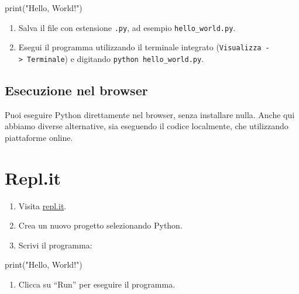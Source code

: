 \documentclass[
  letterpaper,
]{scrbook}
\newenvironment{Shaded}{\begin{snugshade}}{\end{snugshade}}
\newcommand{\BuiltInTok}[1]{\textcolor[rgb]{0.00,0.23,0.31}{#1}}
\newcommand{\NormalTok}[1]{\textcolor[rgb]{0.00,0.23,0.31}{#1}}
\newcommand{\StringTok}[1]{\textcolor[rgb]{0.13,0.47,0.30}{#1}}
\providecommand{\tightlist}{%
  \setlength{\itemsep}{0pt}\setlength{\parskip}{0pt}}\usepackage{longtable,booktabs,array}
\begin{document}
\begin{Shaded}
\begin{Highlighting}[]
\BuiltInTok{print}\NormalTok{(}\StringTok{"Hello, World!"}\NormalTok{)}
\end{Highlighting}
\end{Shaded}

\begin{enumerate}
\def\labelenumi{\arabic{enumi}.}
\setcounter{enumi}{5}
\tightlist
\item
  Salva il file con estensione \texttt{.py}, ad esempio
  \texttt{hello\_world.py}.
\item
  Esegui il programma utilizzando il terminale integrato
  (\texttt{Visualizza\ -\textgreater{}\ Terminale}) e digitando
  \texttt{python\ hello\_world.py}.
\end{enumerate}

\subsection{Esecuzione nel browser}\label{esecuzione-nel-browser}

Puoi eseguire Python direttamente nel browser, senza installare nulla.
Anche qui abbiamo diverse alternative, sia eseguendo il codice
localmente, che utilizzando piattaforme online.

\section{Repl.it}

\begin{enumerate}
\def\labelenumi{\arabic{enumi}.}
\tightlist
\item
  Visita \href{https://repl.it/}{repl.it}.
\item
  Crea un nuovo progetto selezionando Python.
\item
  Scrivi il programma:
\end{enumerate}

\begin{Shaded}
\begin{Highlighting}[]
\BuiltInTok{print}\NormalTok{(}\StringTok{"Hello, World!"}\NormalTok{)}
\end{Highlighting}
\end{Shaded}

\begin{enumerate}
\def\labelenumi{\arabic{enumi}.}
\setcounter{enumi}{3}
\tightlist
\item
  Clicca su ``Run'' per eseguire il programma.
\end{enumerate}
\end{document}
